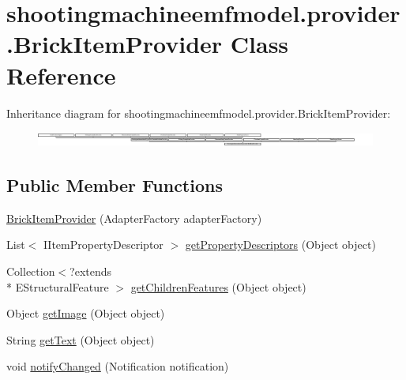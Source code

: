 \hypertarget{classshootingmachineemfmodel_1_1provider_1_1_brick_item_provider}{\section{shootingmachineemfmodel.\-provider.\-Brick\-Item\-Provider Class Reference}
\label{classshootingmachineemfmodel_1_1provider_1_1_brick_item_provider}
}
Inheritance diagram for shootingmachineemfmodel.\-provider.\-Brick\-Item\-Provider\-:\begin{figure}[H]
\begin{center}
\leavevmode
\includegraphics[height=0.499109cm]{classshootingmachineemfmodel_1_1provider_1_1_brick_item_provider}
\end{center}
\end{figure}
\subsection*{Public Member Functions}
\begin{DoxyCompactItemize}
\item 
\hyperlink{classshootingmachineemfmodel_1_1provider_1_1_brick_item_provider_a1abe419377d995fd800d952ea22f477f}{Brick\-Item\-Provider} (Adapter\-Factory adapter\-Factory)
\item 
List$<$ I\-Item\-Property\-Descriptor $>$ \hyperlink{classshootingmachineemfmodel_1_1provider_1_1_brick_item_provider_a64f3b7d2d702207489690f2392084226}{get\-Property\-Descriptors} (Object object)
\item 
Collection$<$?extends \\*
E\-Structural\-Feature $>$ \hyperlink{classshootingmachineemfmodel_1_1provider_1_1_brick_item_provider_ac4540b5dea6a7069abfc333db1999b93}{get\-Children\-Features} (Object object)
\item 
Object \hyperlink{classshootingmachineemfmodel_1_1provider_1_1_brick_item_provider_afe8dba79239991d4d36c33f8fbabca2b}{get\-Image} (Object object)
\item 
String \hyperlink{classshootingmachineemfmodel_1_1provider_1_1_brick_item_provider_afa0824d6515f37b1ecb6f0d1139063bc}{get\-Text} (Object object)
\item 
void \hyperlink{classshootingmachineemfmodel_1_1provider_1_1_brick_item_provider_a7220df99b0d3db891c6fe667cc2f5a6c}{notify\-Changed} (Notification notification)
\end{DoxyCompactItemize}
